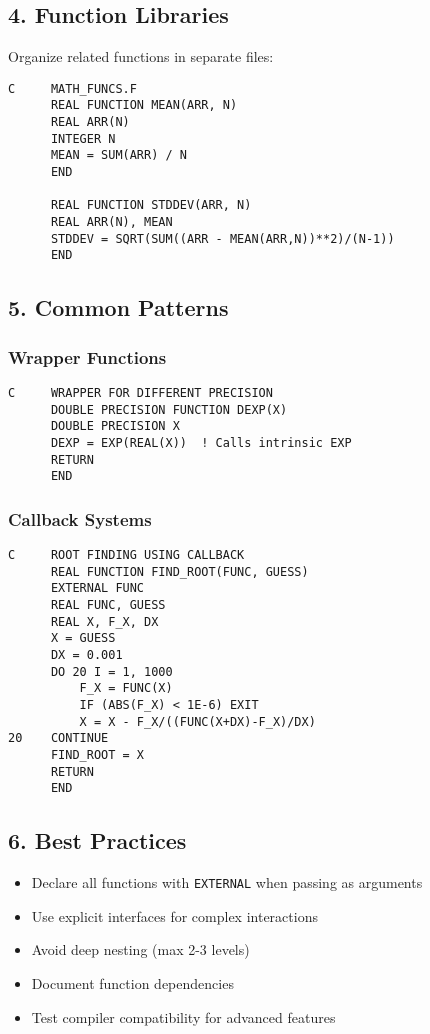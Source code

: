 \documentclass{book}
\begin{document}
\subsection*{4. Function Libraries}
Organize related functions in separate files:
\begin{verbatim}
C     MATH_FUNCS.F
      REAL FUNCTION MEAN(ARR, N)
      REAL ARR(N)
      INTEGER N
      MEAN = SUM(ARR) / N
      END

      REAL FUNCTION STDDEV(ARR, N)
      REAL ARR(N), MEAN
      STDDEV = SQRT(SUM((ARR - MEAN(ARR,N))**2)/(N-1))
      END
\end{verbatim}

\subsection*{5. Common Patterns}
\subsubsection*{Wrapper Functions}
\begin{verbatim}
C     WRAPPER FOR DIFFERENT PRECISION
      DOUBLE PRECISION FUNCTION DEXP(X)
      DOUBLE PRECISION X
      DEXP = EXP(REAL(X))  ! Calls intrinsic EXP
      RETURN
      END
\end{verbatim}

\subsubsection*{Callback Systems}
\begin{verbatim}
C     ROOT FINDING USING CALLBACK
      REAL FUNCTION FIND_ROOT(FUNC, GUESS)
      EXTERNAL FUNC
      REAL FUNC, GUESS
      REAL X, F_X, DX
      X = GUESS
      DX = 0.001
      DO 20 I = 1, 1000
          F_X = FUNC(X)
          IF (ABS(F_X) < 1E-6) EXIT
          X = X - F_X/((FUNC(X+DX)-F_X)/DX)
20    CONTINUE
      FIND_ROOT = X
      RETURN
      END
\end{verbatim}

\subsection*{6. Best Practices}
\begin{itemize}
\item Declare all functions with \texttt{EXTERNAL} when passing as arguments
\item Use explicit interfaces for complex interactions
\item Avoid deep nesting (max 2-3 levels)
\item Document function dependencies
\item Test compiler compatibility for advanced features
\end{itemize}
\end{document}
